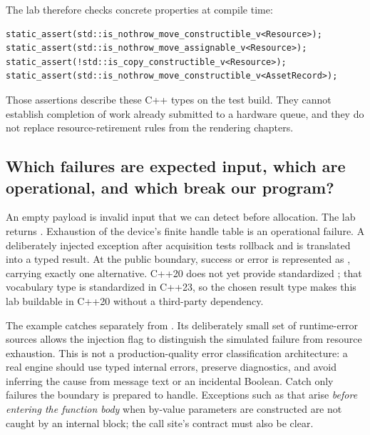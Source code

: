 The lab therefore checks concrete properties at compile time:

\begin{verbatim}
static_assert(std::is_nothrow_move_constructible_v<Resource>);
static_assert(std::is_nothrow_move_assignable_v<Resource>);
static_assert(!std::is_copy_constructible_v<Resource>);
static_assert(std::is_nothrow_move_constructible_v<AssetRecord>);
\end{verbatim}

Those assertions describe these C++ types on the test build. They cannot establish completion of work already submitted to a hardware queue, and they do not replace resource-retirement rules from the rendering chapters.

\subsection{Which failures are expected input, which are operational, and which break our program?}\label{01-foundations-i-ch004-which-failures-are-expected-input-which-are-operational-and-which-break-our-program}

\hypertarget{01-foundations-i-ch004-which-failures-are-expected-input-which-are-operational-and-which-break-our-program}{}

An empty payload is invalid input that we can detect before allocation. The lab returns . Exhaustion of the device's finite handle table is an operational failure. A deliberately injected exception after acquisition tests rollback and is translated into a typed result. At the public boundary, success or error is represented as , carrying exactly one alternative. C++20 does not yet provide standardized ; that vocabulary type is standardized in C++23, so the chosen result type makes this lab buildable in C++20 without a third-party dependency.

The example catches  separately from . Its deliberately small set of runtime-error sources allows the injection flag to distinguish the simulated failure from resource exhaustion. This is not a production-quality error classification architecture: a real engine should use typed internal errors, preserve diagnostics, and avoid inferring the cause from message text or an incidental Boolean. Catch only failures the boundary is prepared to handle. Exceptions such as  that arise \emph{before entering the function body} when by-value parameters are constructed are not caught by an internal  block; the call site's contract must also be clear.

